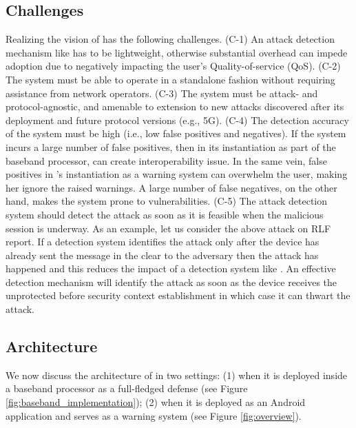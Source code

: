 \subsection{Challenges}
Realizing the vision of \system has the following challenges.
(C-1) An attack detection mechanism like \system has to be lightweight,
otherwise substantial overhead can impede adoption due to negatively impacting the user's Quality-of-service (QoS).
(C-2) The system must be able to operate in a standalone fashion without
requiring assistance from network operators.
(C-3) The system must be attack- and protocol-agnostic, and amenable to extension
to new attacks discovered after its deployment and future protocol versions (e.g., 5G).
(C-4) The detection accuracy of the system must be high (i.e., low false positives and negatives).
If the system incurs a large number of false positives, then in its instantiation
as part of the baseband processor, can create interoperability issue. In the same vein, false positives in
\system{}'s instantiation as a warning system can overwhelm the user, making her ignore the raised warnings.
A large number of false negatives, on the other hand, makes the system prone to vulnerabilities.
(C-5) The attack detection system should detect the attack as soon as it is feasible when
the malicious session is underway. As an example, let us consider the above attack on RLF report.
If a detection system identifies the attack only after the device has already sent the \rlfReport message in the clear
to the adversary then the attack has happened and this reduces the impact of a detection system like \system. An
effective detection mechanism will identify the attack as soon as the device receives the
unprotected  \ueInformationRequest before security context establishment in which case
it can thwart the attack.




\subsection{\systemtitle Architecture}
We now discuss the architecture of \system in two settings:
(1) when it is deployed inside a baseband processor as a full-fledged
defense (see Figure \ref{fig:baseband_implementation});
(2) when it is deployed as an Android application and serves as a warning system (see Figure \ref{fig:overview}).




